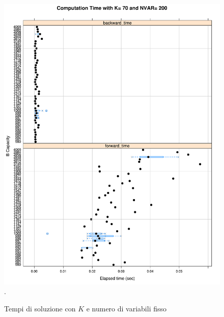 \documentclass{llncs}
\begin{document}
\begin{figure}[!h]
  \centering
  \includegraphics[width=12cm]{img/graph_all-time_by_b.pdf}.
  \caption{Tempi di soluzione con $K$ e numero di variabili fisso}
  \label{fig:time_by_b}
\end{figure}

\newpage
\end{document}
